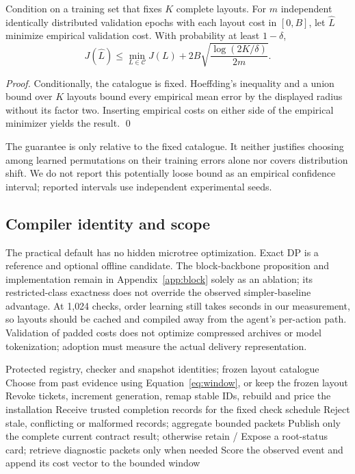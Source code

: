 \begin{proposition}\label{prop:valid}
Condition on a training set that fixes $K$ complete layouts. For $m$
independent identically distributed validation epochs with each layout cost in
$[0,B]$, let $\widehat L$ minimize empirical validation cost. With probability at
least $1-\delta$,
\begin{equation}J(\widehat L)\le \min_{L\in\mathcal C}J(L)+2B\sqrt{\frac{\log(2K/\delta)}{2m}}.\label{eq:valid}\end{equation}
\end{proposition}
\begin{proof}
Conditionally, the catalogue is fixed. Hoeffding's inequality and a union bound
over $K$ layouts bound every empirical mean error by the displayed radius
without its factor two. Inserting empirical costs on either side of the empirical
minimizer yields the result. \qed
\end{proof}
The guarantee is only relative to the fixed catalogue. It neither justifies
choosing among learned permutations on their training errors alone nor covers
distribution shift. We do not report this potentially loose bound as an empirical
confidence interval; reported intervals use independent experimental seeds.

\subsection{Compiler identity and scope}\label{sec:compiler-scope}
The practical default has no hidden microtree optimization. Exact DP is a
reference and optional offline candidate. The block-backbone proposition and
implementation remain in Appendix~\ref{app:block} solely as an ablation; its
restricted-class exactness does not override the observed simpler-baseline
advantage. At 1{,}024 checks, order learning still takes seconds in our
measurement, so layouts should be cached and compiled away from the agent's
per-action path. Validation of padded costs does not optimize compressed
archives or model tokenization; adoption must measure the actual delivery
representation.

\begin{algorithm}[t]\caption{Deployable evidence control; inference and checking remain separate}\label{alg:control}
\begin{algorithmic}[1]
\Require Protected registry, checker and snapshot identities; frozen layout catalogue
\State Choose from past evidence using Equation~\eqref{eq:window}, or keep the frozen layout
\State Revoke tickets, increment generation, remap stable IDs, rebuild and price the installation
\EndIf
\State Receive trusted completion records for the fixed check schedule
\State Reject stale, conflicting or malformed records; aggregate bounded packets
\State Publish only the complete current contract result; otherwise retain \FAIL/\UNKNOWN
\State Expose a root-status card; retrieve diagnostic packets only when needed
\State Score the observed event and append its cost vector to the bounded window
\EndFor
\end{algorithmic}\end{algorithm}

